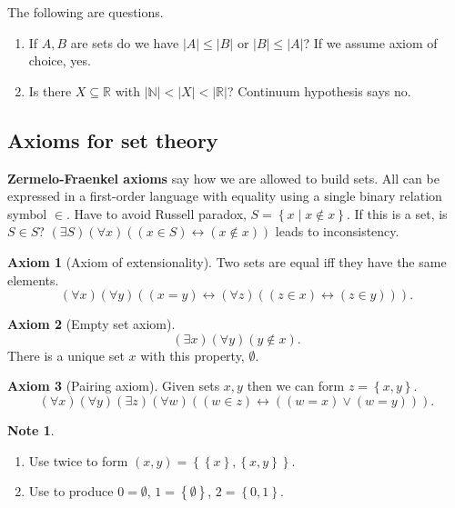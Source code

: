 \documentclass{article}
\newcommand{\N}{\mathbb{N}}
\newcommand{\R}{\mathbb{R}}
\newcommand{\rb}[1]{\left( #1 \right)}
\newcommand{\cb}[1]{\left\{ #1 \right\}}
\newcommand{\abs}[1]{\left\lvert #1 \right\rvert}
\newcommand{\orb}[2]{\rb{#1 \lor #2}}
\newcommand{\iffb}[2]{\rb{#1 \leftrightarrow #2}}
\newcommand{\fab}[1]{\rb{\forall #1}}
\newcommand{\teb}[1]{\rb{\exists #1}}
\newcommand{\eqb}[2]{\rb{#1 = #2}}
\newcommand{\inb}[2]{\rb{#1 \in #2}}
\newcommand{\nib}[2]{\rb{#1 \notin #2}}
\theoremstyle{definition}\newtheorem{definition}{Definition}[subsection]
\theoremstyle{definition}\newtheorem{remark}[definition]{Remark}
\theoremstyle{definition}\newtheorem*{example}{Example}
\theoremstyle{definition}\newtheorem*{note}{Note}
\newtheorem{axiom}{Axiom}
\begin{document}
The following are questions.
\begin{enumerate}
\item If $ A, B $ are sets do we have $ \abs{A} \le \abs{B} $ or $ \abs{B} \le \abs{A} $? If we assume axiom of choice, yes.
\item Is there $ X \subseteq \R $ with $ \abs{\N} < \abs{X} < \abs{\R} $? Continuum hypothesis says no.
\end{enumerate}

\subsection{Axioms for set theory}

\textbf{Zermelo-Fraenkel axioms} say how we are allowed to build sets. All can be expressed in a first-order language with equality using a single binary relation symbol $ \in $. Have to avoid Russell paradox, $ S = \cb{x \mid x \notin x} $. If this is a set, is $ S \in S $? $ \teb{S}\fab{x}\iffb{\inb{x}{S}}{\nib{x}{x}} $ leads to inconsistency.

\begin{axiom}[Axiom of extensionality]
Two sets are equal iff they have the same elements.
$$ \fab{x}\fab{y}\iffb{\eqb{x}{y}}{\fab{z}\iffb{\inb{z}{x}}{\inb{z}{y}}}. $$
\end{axiom}

\begin{axiom}[Empty set axiom]
$$ \teb{x}\fab{y}\nib{y}{x}. $$
There is a unique set $ x $ with this property, $ \emptyset $.
\end{axiom}


\begin{axiom}[Pairing axiom]
Given sets $ x, y $ then we can form $ z = \cb{x, y} $.
$$ \fab{x}\fab{y}\teb{z}\fab{w}\iffb{\inb{w}{z}}{\orb{\eqb{w}{x}}{\eqb{w}{y}}}. $$
\end{axiom}

\begin{note}
\hfill
\begin{enumerate}
\item Use twice to form $ \rb{x, y} = \cb{\cb{x}, \cb{x, y}} $.
\item Use to produce $ 0 = \emptyset $, $ 1 = \cb{\emptyset} $, $ 2 = \cb{0, 1} $.
\end{enumerate}
\end{note}
\end{document}
